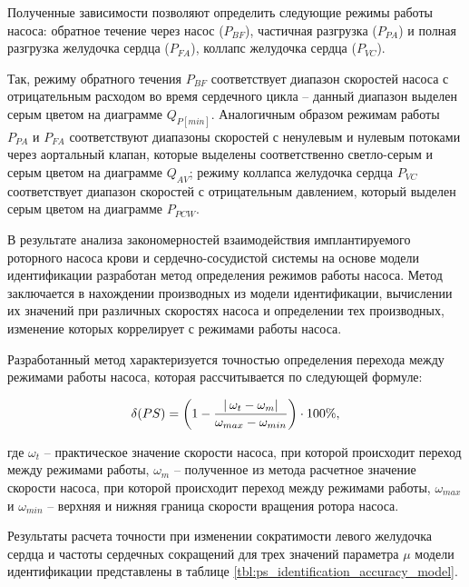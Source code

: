 Полученные зависимости позволяют определить следующие режимы работы насоса: обратное течение через насос ($P_{BF}$), частичная разгрузка ($P_{PA}$) и полная разгрузка желудочка сердца ($P_{FA}$), коллапс желудочка сердца ($P_{VC}$). 

Так, режиму обратного течения $P_{BF}$ соответствует диапазон скоростей насоса с отрицательным расходом во время сердечного цикла -- данный диапазон выделен серым цветом на диаграмме $Q_{P[min]}$. Аналогичным образом режимам работы $P_{PA}$ и $P_{FA}$ соответствуют диапазоны скоростей с ненулевым и нулевым потоками через аортальный клапан, которые выделены соответственно светло-серым и серым цветом на диаграмме $Q_{AV}$; режиму коллапса желудочка сердца $P_{VC}$ соответствует диапазон скоростей с отрицательным давлением, который выделен серым цветом на диаграмме $P_{PCW}$.


В результате анализа закономерностей взаимодействия имплантируемого роторного насоса крови и сердечно-сосудистой системы на основе модели идентификации разработан метод определения режимов работы насоса. Метод заключается в нахождении производных из модели идентификации, вычислении их значений при различных скоростях насоса и определении тех производных, изменение которых коррелирует с режимами работы насоса. 

Разработанный метод характеризуется точностью определения перехода между режимами работы насоса, которая рассчитывается по следующей формуле:

\begin{equation}
	\label{eq:ps_identification_accuracy}
	\delta(PS) = \left(1 - \frac{\lvert\hskip2pt \omega_t - \omega_m \rvert}{\omega_{max} - \omega_{min}} \right) \cdot 100\%,
\end{equation}

\noindent где $\omega_t$ -- практическое значение скорости насоса, при которой происходит переход между режимами работы, $\omega_m$ -- полученное из метода расчетное значение скорости насоса, при которой происходит переход между режимами работы, $\omega_{max}$ и $\omega_{min}$ -- верхняя и нижняя граница скорости вращения ротора насоса.

Результаты расчета точности при изменении сократимости левого желудочка сердца и частоты сердечных сокращений для трех значений параметра $\mu$ модели идентификации представлены в таблице \ref{tbl:ps_identification_accuracy_model}. %

